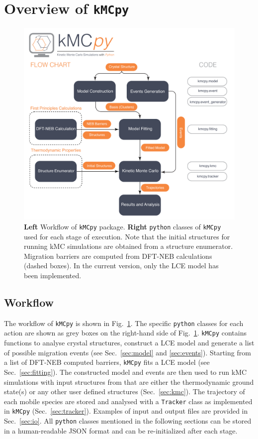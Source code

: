 \documentclass[a4paper,fleqn]{cas-dc}
\begin{document}
{\section{Overview of \texttt{kMCpy}}\label{sec:code}
\begin{figure}
    \centering
    \includegraphics[width=1\textwidth]{Figures/Total_flowchart.pdf}
    \caption{\textbf{Left} Workflow of \texttt{kMCpy} package. \textbf{Right} \texttt{python} classes of \texttt{kMCpy} used for each stage of execution. Note that the initial structures for running kMC simulations are obtained from a structure enumerator. Migration barriers are computed from DFT-NEB calculations (dashed boxes). In the current version, only the LCE model has been implemented.}
    \label{fig:total_flowchart}
\end{figure}

\subsection{Workflow}
\noindent The workflow of \texttt{kMCpy} is shown in Fig.~\ref{fig:total_flowchart}. The specific \texttt{python} classes for each action are shown as grey boxes on the right-hand side of Fig.~\ref{fig:total_flowchart}. \texttt{kMCpy} contains functions to analyse crystal structures, construct a LCE model and generate a list of possible migration events (see Sec.~\ref{sec:model} and \ref{sec:events}).  Starting from a list of DFT-NEB computed barriers, {\texttt{kMCpy}} fits a LCE model (see Sec.~{\ref{sec:fitting}}). The constructed model and events are then used to run kMC simulations with input structures from that are either the thermodynamic ground state(s) or any other user defined structures (Sec.~\ref{sec:kmc}). The trajectory of each mobile species are stored and analysed with a \texttt{Tracker} class as implemented in \texttt{kMCpy} (Sec.~\ref{sec:tracker}). Examples of input and output files are provided in Sec.~\ref{sec:io}. All \texttt{python} classes mentioned in the following sections can be stored in a human-readable JSON format and can be re-initialized after each stage. 

}
\end{document}
